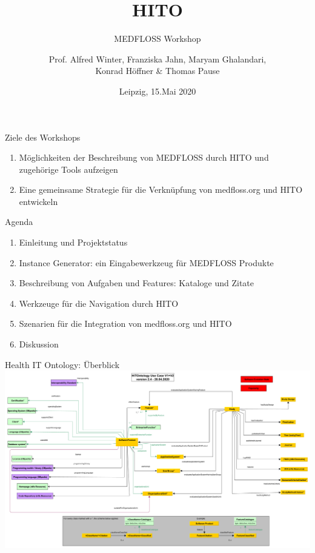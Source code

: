 \documentclass[aspectratio=1610,12pt]{beamer}
\author{Prof. Alfred Winter, Franziska Jahn, Maryam Ghalandari, \\Konrad Höffner \& Thomas Pause}
\date{Leipzig, 15.Mai 2020}
\title{HITO}
\subtitle{MEDFLOSS Workshop}
\begin{document}
\begin{frame}
\titlepage
\end{frame}

\begin{frame}{Ziele des Workshops}
\begin{spacing}{1.5}
  \begin{enumerate}
    \item Möglichkeiten der Beschreibung von MEDFLOSS durch HITO und zugehörige Tools aufzeigen
    \item Eine gemeinsame Strategie für die Verknüpfung von medfloss.org und HITO entwickeln
  \end{enumerate}
\end{spacing}
\end{frame}

\begin{frame}{Agenda}
  \begin{spacing}{1.5}
    \begin{enumerate}
      \item Einleitung und Projektstatus
      \item Instance Generator: ein Eingabewerkzeug für MEDFLOSS Produkte
      \item Beschreibung von Aufgaben und Features: Kataloge und Zitate
      \item Werkzeuge für die Navigation durch HITO
      \item Szenarien für die Integration von medfloss.org und HITO
      \item Diskussion
    \end{enumerate}
  \end{spacing}
\end{frame}

\begin{frame}{Health IT Ontology: Überblick}
\vspace{-0.5cm}
\centering
\includegraphics[width=\textwidth]{img/HITontology.pdf}
\end{frame}
\end{document}
